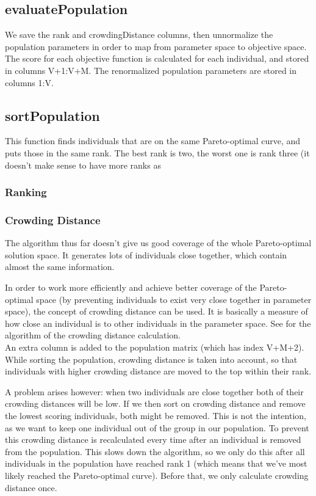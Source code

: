 \subsection{evaluatePopulation} \label{evaluatePopulation}
We save the rank and crowdingDistance columns, then unnormalize the population parameters in order to map from parameter space to objective space. The score for each objective function is calculated for each individual, and stored in columns V+1:V+M. The renormalized population parameters are stored in columns 1:V. 

\subsection{sortPopulation} \label{sortPopulation}
This function finds individuals that are on the same Pareto-optimal curve, and puts those in the same rank. The best rank is two, the worst one is rank three (it doesn't make sense to have more ranks as 
\subsubsection{Ranking}

\subsubsection{Crowding Distance}
The algorithm thus far doesn't give us good coverage of the whole Pareto-optimal solution space. It generates lots of individuals close together, which contain almost the same information. 


In order to work more efficiently and achieve better coverage of the Pareto-optimal space (by preventing individuals to exist very close together in parameter space), the concept of crowding distance can be used. It is basically a measure of how close an individual is to other individuals in the parameter space. See  for the algorithm of the crowding distance calculation.\\
An extra column is added to the population matrix (which has index V+M+2). While sorting the population, crowding distance is taken into account, so that individuals with higher crowding distance are moved to the top within their rank.


A problem arises however: when two individuals are close together both of their crowding distances will be low. If we then sort on crowding distance and remove the lowest scoring individuals, both might be removed. This is not the intention, as we want to keep one individual out of the group in our population. To prevent this crowding distance is recalculated every time after an individual is removed from the population. This slows down the algorithm, so we only do this after all individuals in the population have reached rank 1 (which means that we've most likely reached the Pareto-optimal curve). Before that, we only calculate crowding distance once.

